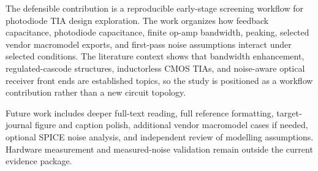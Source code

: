 The defensible contribution is a reproducible early-stage screening workflow for photodiode TIA design exploration. The work organizes how feedback capacitance, photodiode capacitance, finite op-amp bandwidth, peaking, selected vendor macromodel exports, and first-pass noise assumptions interact under selected conditions. The literature context shows that bandwidth enhancement, regulated-cascode structures, inductorless CMOS TIAs, and noise-aware optical receiver front ends are established topics, so the study is positioned as a workflow contribution rather than a new circuit topology.

Future work includes deeper full-text reading, full reference formatting, target-journal figure and caption polish, additional vendor macromodel cases if needed, optional SPICE noise analysis, and independent review of modelling assumptions. Hardware measurement and measured-noise validation remain outside the current evidence package.
